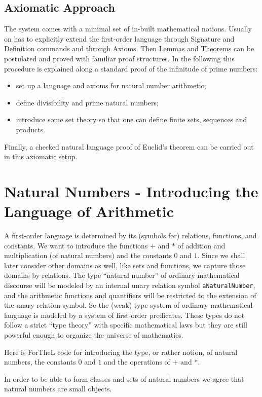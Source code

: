 \documentclass[11pt]{article}
\begin{document}
\subsection{Axiomatic Approach}

The \Naproche{} system
comes with a minimal set of in-built mathematical notions.
Usually on has to explicitly extend the first-order
language through Signature and Definition commands and through
Axioms. Then Lemmas and Theorems can be postulated and proved
with familiar proof structures. In the following this procedure
is explained along a standard proof of the infinitude of 
prime numbers:
\begin{itemize}
\item
set up a language and axioms for natural number arithmetic;
\item
define divisibility and prime natural numbers;
\item
introduce some set theory so that one can define
finite sets, sequences and products.
\end{itemize}
Finally, a checked natural language proof of Euclid's theorem
can be carried out in this axiomatic setup.

\section{Natural Numbers - Introducing the Language of Arithmetic}

A first-order language is determined by its (symbols for)
relations, functions, and constants. We want to introduce 
the functions $+$ and $*$ of addition and multiplication
(of natural numbers)
and the constants $0$ and $1$. Since we shall 
later consider other domains as well, like sets and functions,
we capture those domains by relations. The type ``natural number''
of ordinary mathematical discourse will be modeled by an
internal unary relation symbol
\verb+aNaturalNumber+, and the arithmetic functions and 
quantifiers will be
restricted to the extension of the unary relation symbol.
So the (weak) type system of ordinary mathematical language
is modeled by a system of first-order predicates. These
types do not follow a strict ``type theory'' with specific
mathematical laws but they are still powerful enough
to organize the universe of mathematics.

Here is ForTheL code for introducing the type, or rather
notion, of natural numbers, the constants $0$ and $1$
and the operations of $+$ and $*$.

In order to be able to form classes and sets of natural numbers 
we agree that natural numbers are small objects.
 
\end{document}
